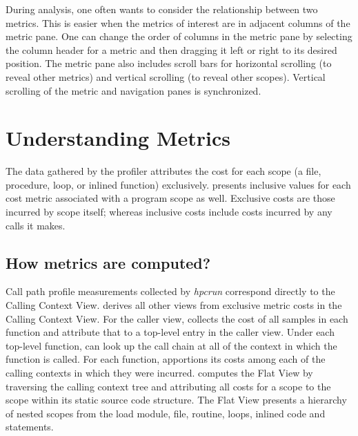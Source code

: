  During analysis, one often wants to consider the relationship between two metrics. This is easier when the metrics of interest are in adjacent columns of the metric pane. One can change the order of columns in the metric pane by selecting the column header for a metric and then dragging it left or right to its desired position. The metric pane also includes scroll bars for horizontal scrolling (to reveal other metrics) and vertical scrolling (to reveal other scopes). Vertical scrolling of the metric and navigation panes is synchronized.



\section{Understanding Metrics}

 The data gathered by the profiler attributes the cost for each scope (a file, procedure, loop, or inlined function) exclusively.
\hpcviewer{} presents inclusive values for each cost metric associated with a program scope as well.
Exclusive costs are those incurred by scope itself; whereas inclusive costs include costs incurred by any calls it makes.


\subsection{How metrics are computed?}

Call path profile measurements collected by \textit{hpcrun} correspond directly to the Calling Context View.
\hpcviewer{} derives all other views from exclusive metric costs in the Calling Context View.
For the caller view, \hpcviewer{} collects the cost of all samples in each function and attribute that to a top-level entry in the caller view.
Under each top-level function, \hpcviewer{} can look up the call chain at all of the context in which the function is called.
For each function, \hpcviewer{} apportions its costs among each of the calling contexts in which they were incurred.
\hpcviewer{} computes the Flat View by traversing the calling context tree and attributing all costs for a scope to the scope within its static source code structure.
The Flat View presents a hierarchy of nested scopes from the load module, file, routine, loops, inlined code and statements.

